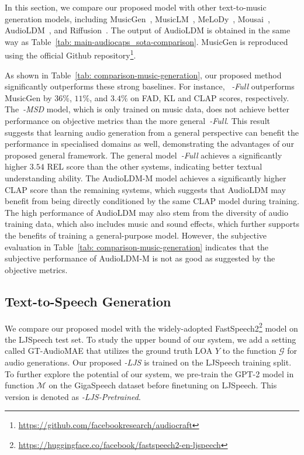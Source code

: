 \documentclass[lettersize,journal]{IEEEtran}
\begin{document}
In this section, we compare our proposed model with other text-to-music generation models, including MusicGen~\cite{copet2023simple-musicgen}, MusicLM~\cite{agostinelli2023musiclm}, MeLoDy~\cite{lam2023efficient-melody}, Mousai~\cite{schneider2023mo}, AudioLDM~\cite{liu2023audioldm}, and Riffusion~\cite{riffusion}. The output of AudioLDM is obtained in the same way as Table~\ref{tab: main-audiocaps_sota-comparison}. MusicGen is reproduced using the official Github repository\footnote{\url{https://github.com/facebookresearch/audiocraft}}. 

As shown in Table~\ref{tab: comparison-music-generation}, our proposed method significantly outperforms these strong baselines. For instance, ~\vModelName\textit{-Full} outperforms MusicGen by $36\%$, $11\%$, and $3.4\%$ on FAD, KL and CLAP scores, respectively. The~\vModelName\textit{-MSD} model, which is only trained on music data, does not achieve better performance on objective metrics than the more general~\vModelName\textit{-Full}. This result suggests that learning audio generation from a general perspective can benefit the performance in specialised domains as well, demonstrating the advantages of our proposed general framework. The general model~\vModelName\textit{-Full} achieves a significantly higher $3.54$ REL score than the other systems, indicating better textual understanding ability. 
The AudioLDM-M model achieves a significantly higher CLAP score than the remaining systems, which suggests that AudioLDM may benefit from being directly conditioned by the same CLAP model during training.
The high performance of AudioLDM may also stem from the diversity of audio training data, which also includes music and sound effects, which further supports the benefits of training a general-purpose model. However, the subjective evaluation in Table~\ref{tab: comparison-music-generation} indicates that the subjective performance of AudioLDM-M is not as good as suggested by the objective metrics. 


\subsection{Text-to-Speech Generation} 

\noindent
We compare our proposed model with the widely-adopted FastSpeech2\footnote{\url{https://huggingface.co/facebook/fastspeech2-en-ljspeech}} model on the LJSpeech test set. To study the upper bound of our system, we add a setting called GT-AudioMAE that utilizes the ground truth LOA $Y$ to the function $\mathcal{G}$ for audio generations. Our proposed \vModelName\textit{-LJS} is trained on the LJSpeech training split. To further explore the potential of our system, we pre-train the GPT-2 model in function $\mathcal{M}$ on the GigaSpeech dataset before finetuning on LJSpeech. This version is denoted as \vModelName\textit{-LJS-Pretrained}. 
\end{document}
